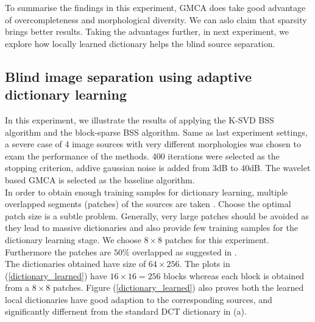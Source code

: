 
To summarise the findings in this experiment, GMCA does take good advantage of overcompleteness and morphological diversity. We can aslo claim that sparsity brings better results. Taking the advantages further, in next experiment, we explore how locally learned dictionary helps the blind source separation.\\


\clearpage
\subsection{Blind image separation using adaptive dictionary learning}
In this experiment, we illustrate the results of applying the K-SVD BSS algorithm and the block-sparse BSS algorithm. Same as last experiment settings, a severe case of 4 image sources with very different morphologies was chosen to exam the performance of the methods. 400 iterations were selected as the stopping criterion, addive gaussian noise is added from 3dB to 40dB. The wavelet based GMCA is selected as the baseline algorithm.\\

In order to obtain enough training samples for dictionary learning, multiple overlapped segments (patches) of the sources are taken \cite{VAbolghasemi2012}. Choose the optimal patch size is a subtle problem. Generally, very large patches should be avoided as they lead to massive dictionaries and also provide few training samples for the dictionary learning stage. We choose $8\times 8$ patches for this experiment. Furthermore the patches are $50\%$ overlapped as suggested in \cite{VAbolghasemi2012}.\\

The dictionaries obtained have size of $64\times 256$. The plots in (\ref{dictionary_learned}) have $16 \times 16 = 256$ blocks whereas each block is obtained from a $8\times 8$ patches. Figure (\ref{dictionary_learned}) also proves both the learned local dictionaries have good adaption to the corresponding sources, and significantly differnent from the standard DCT dictionary in (a).\\

